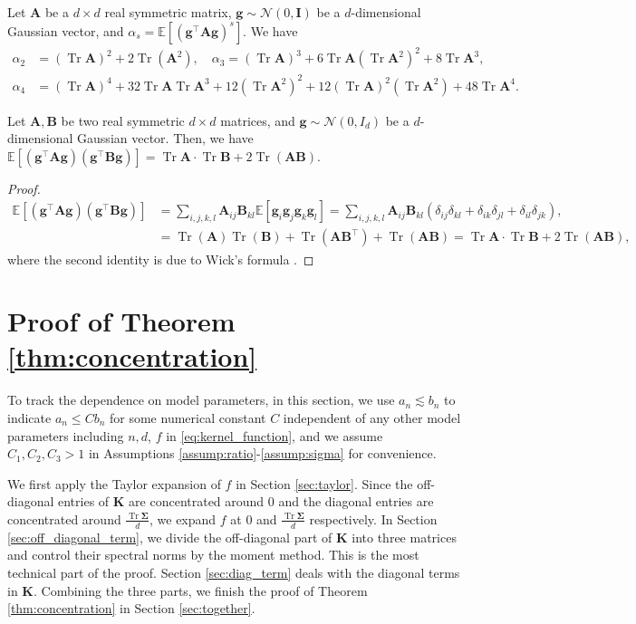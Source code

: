 \documentclass[twoside,11pt]{article}
\newcommand{\E}{\mathbb{E}}
\def\bI{{\mathbf I}}
\def\bA{{\boldsymbol A}}
\def\bB{{\boldsymbol B}}
\def\bK{{\boldsymbol K}}
\def\bg{{\boldsymbol g}}
\def\bSigma{{\boldsymbol \Sigma}}
\renewcommand{\bK}{\boldsymbol{K}}
\newcommand{\Tr}{\operatorname{Tr}}
\newcommand{\1}{\mathbf{1}}
\def\mc#1{\mathcal{#1}}
\def\mc{\mathcal}
\begin{document}
\begin{lemma}\label{lem:quadratic_moments_eq}
    Let $\bA$ be a $d\times d$ real symmetric matrix, $\bg\sim\mc N(0,\bI)$ be a $d$-dimensional Gaussian vector,  and  $\alpha_s=\mathbb E[(\bg^\top \bA \bg)^s]$. We have 
    \begin{align*}
        \alpha_2 &= (\Tr\bA)^2 +2\Tr(\bA^2),\quad 
        \alpha_3 =(\Tr\bA)^3+6\Tr\bA (\Tr\bA^2)^2+8\Tr\bA^3,\\
        \alpha_4&=(\Tr\bA)^4+32\Tr\bA\Tr\bA^3+12(\Tr\bA^2)^2+12(\Tr\bA)^2(\Tr\bA^2)+48\Tr\bA^4.
    \end{align*}


\end{lemma}

\begin{lemma}\label{lem:quadratic_moments_eq2}
     Let $\bA,\bB$ be two real symmetric $d\times d$ matrices, and $\bg\sim\mc N(0,I_d)$ be a $d$-dimensional Gaussian vector. Then, we have   
$        \mathbb E[(\bg^\top \bA \bg)(\bg^\top \bB \bg)] =\Tr\bA\cdot\Tr\bB+2\Tr(\bA\bB).$
\end{lemma}
\begin{proof}
    \begin{align*}
        \mathbb E[(\bg^\top \bA \bg)(\bg^\top \bB \bg)]&=\sum_{i,j,k,l} \bA_{ij}  \bB_{kl}\E[\bg_i\bg_j\bg_k\bg_l]=\sum_{i,j,k,l} \bA_{ij}  \bB_{kl} \left( \delta_{ij}\delta_{kl}+\delta_{ik}\delta_{jl}+\delta_{il}\delta_{jk} \right),\\
        &=\Tr(\bA)\Tr(\bB)+\Tr(\bA\bB^\top)+\Tr (\bA\bB)=\Tr\bA\cdot\Tr\bB+2\Tr(\bA\bB),
    \end{align*}
    where the second identity is due to Wick's formula \citep{wick1950evaluation}.
\end{proof}




\section{Proof of Theorem \ref{thm:concentration}}\label{sec:concentration}
To track the dependence on model parameters, in this section, we use $a_n\lesssim b_n$ to indicate $a_n\leq Cb_n$ for some numerical constant $C$ independent of any other model parameters including $n,d$, $f$ in \eqref{eq:kernel_function}, and we assume $C_1, C_2, C_3>1 $ in Assumptions \ref{assump:ratio}-\ref{assump:sigma} for convenience.

 We first apply the Taylor expansion of  $f$ in Section \ref{sec:taylor}. Since the off-diagonal entries of $\bK$ are concentrated around $0$ and the diagonal entries are concentrated around $\frac{\Tr \bSigma}{d}$, we expand $f$ at $0$ and $\frac{\Tr \bSigma}{d}$ respectively. In Section \ref{sec:off_diagonal_term}, we divide the off-diagonal part of $\bK$ into three matrices and control their spectral norms by the moment method. This is the most technical part of the proof. Section \ref{sec:diag_term} deals with the diagonal terms in $\bK$. Combining the three parts, we finish the proof of Theorem \ref{thm:concentration} in Section \ref{sec:together}.
 
\end{document}
